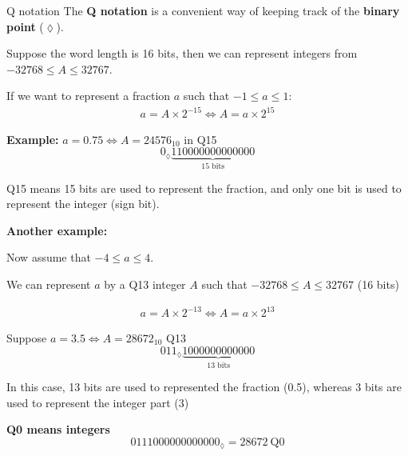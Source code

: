 \documentclass[10pt, handout]{beamer}
\begin{document}
%
\begin{frame}{Q notation}
	The \textbf{Q notation} is a convenient way of keeping track of the \textbf{binary point} ($\lozenge$).
	
	Suppose the word length is 16 bits, then we can represent integers from $-32768 \leq A \leq 32767$.
		
	If we want to represent a fraction $a$ such that $-1\leq a\leq 1$:
	\begin{align*}
	a = A\times 2^{-15} \Longleftrightarrow A = a\times 2^{15}
	\end{align*}
		
	\textbf{Example:}
	$a =  0.75 \Longleftrightarrow A = 24576_{10}$ in Q15
	\begin{equation*}
	0_\lozenge\underbrace{110000000000000}_{\text{15 bits}}
	\end{equation*}
		
	Q15 means 15 bits are used to represent the fraction, and only one bit is used to represent the integer (sign bit).
\end{frame}

%
\begin{frame}
	
	\textbf{Another example:}
	
	Now assume that $-4\leq a\leq 4$. 
	
	We can represent $a$ by a Q13 integer $A$ such that $-32768 \leq A \leq 32767$ (16 bits)
	
	\begin{align*}
	a = A\times 2^{-13} \Longleftrightarrow A = a\times 2^{13}
	\end{align*}
	
	Suppose $a =  3.5 \Longleftrightarrow A = 28672_{10}$ Q13
	\begin{equation*}
	011_\lozenge\underbrace{1000000000000}_{\text{13 bits}}
	\end{equation*}
	
	In this case, 13 bits are used to represented the fraction (0.5), whereas 3 bits are used to represent the integer part (3)
	
	\textbf{Q0 means integers}
	\begin{equation*}
	0111000000000000_\lozenge = 28672~\text{Q0}
	\end{equation*}
\end{frame}
\end{document}
